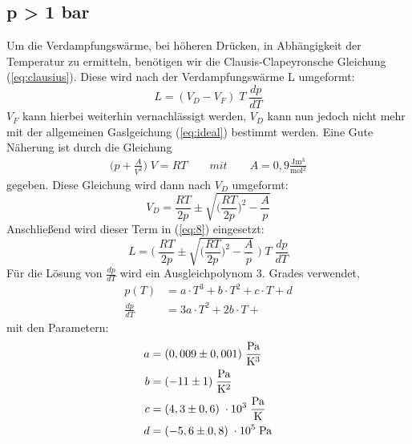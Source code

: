 \subsection{p > 1 bar}
Um die Verdampfungswärme, bei höheren Drücken, in Abhängigkeit der Temperatur zu
ermitteln, benötigen wir die Clausis-Clapeyronsche Gleichung (\ref{eq:clausius}).
Diese wird nach der Verdampfungswärme L umgeformt:
\begin{equation}
  L = (V_D - V_F) \;T\; \frac{dp}{dT} \label{eq:8}
\end{equation}
$V_F$ kann hierbei weiterhin vernachlässigt werden, $V_D$ kann nun jedoch nicht mehr
mit der allgemeinen Gaslgeichung (\ref{eq:ideal}) bestimmt werden.
Eine Gute Näherung ist durch die Gleichung
\begin{align}
  \biggr(p + \frac{A}{V^2}\biggl) \; V = RT \qquad mit \qquad A = 0,9 \frac{\si{\joule \meter^3}}
  {\si{\mol^2}}
\end{align}
gegeben.
Diese Gleichung wird dann nach $V_D$ umgeformt:
\begin{equation}
  V_D = \frac{RT}{2p} \pm \sqrt{\biggr(\frac{RT}{2p}\biggl)^2-\frac{A}{p}}
\end{equation}
Anschließend wird dieser Term in (\ref{eq:8}) eingesetzt:
\begin{equation}
  L = \Biggr(\; \frac{RT}{2p} \pm \sqrt{\biggr(\frac{RT}{2p}\biggl)^2-\frac{A}{p}} \; \Biggl)
  \; T \; \frac{dp}{dT}
\end{equation}
Für die Lösung von $\frac{dp}{dT}$ wird ein Ausgleichpolynom 3. Grades verwendet,
\begin{align}
  p(T) &= a \cdot T^3 + b \cdot T^2 + c \cdot T + d  \label{eq:pt}\\
  \frac{dp}{dT} &= 3a \cdot T^2 + 2b \cdot T +    \label{eq:dp}
\end{align}
mit den Parametern:
\begin{align*}
  a &= (0,009 \pm 0,001) \; \si{\frac{\pascal}{\kelvin^3}} \\
  b &= (-11 \pm 1) \; \si{\frac{\pascal}{\kelvin^2}} \\
  c &= (4,3 \pm 0,6) \; \cdot 10^3 \; \si{\frac{\pascal}{\kelvin}} \\
  d &= (-5,6 \pm 0,8)\; \cdot 10^5 \; \si{\pascal}
\end{align*}

